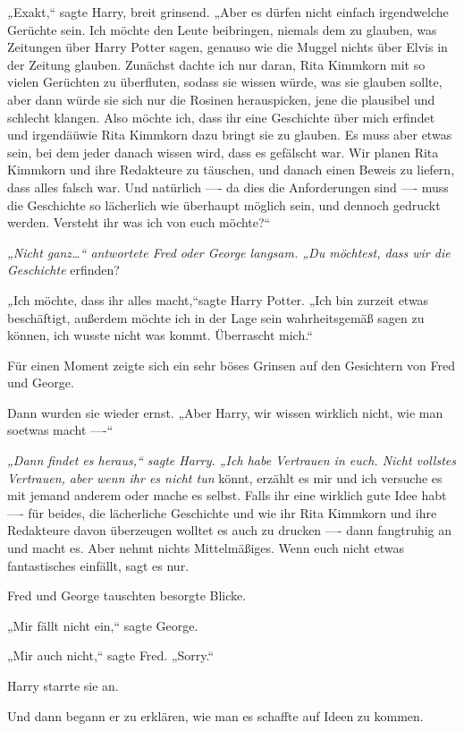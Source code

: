 {\emph{„}Exakt,“ sagte Harry, breit grinsend. „Aber es dürfen nicht einfach irgendwelche Gerüchte sein. Ich möchte den Leute beibringen, niemals dem zu glauben, was Zeitungen über Harry Potter sagen, genauso wie die Muggel nichts über Elvis in der Zeitung glauben. Zunächst dachte ich nur daran, Rita Kimmkorn mit so vielen Gerüchten zu überfluten, sodass sie wissen würde, was sie glauben sollte, aber dann würde sie sich nur die Rosinen herauspicken, jene die plausibel und schlecht klangen. Also möchte ich, dass ihr eine Geschichte über mich erfindet und irgendäüwie Rita Kimmkorn dazu bringt sie zu glauben. Es muss aber etwas sein, bei dem jeder danach wissen wird, dass es gefälscht war. Wir planen Rita Kimmkorn und ihre Redakteure zu täuschen, und danach einen Beweis zu liefern, dass alles falsch war. Und natürlich ---- da dies die Anforderungen sind ---- muss die Geschichte so lächerlich wie überhaupt möglich sein, und dennoch gedruckt werden. Versteht ihr was ich von euch möchte?“

\emph{„Nicht ganz…“ antwortete Fred oder George langsam. „Du möchtest, dass wir die Geschichte} erfinden?

\emph{„}Ich möchte, dass ihr alles macht,“sagte Harry Potter. „Ich bin zurzeit etwas beschäftigt, außerdem möchte ich in der Lage sein wahrheitsgemäß sagen zu können, ich wusste nicht was kommt. Überrascht mich.“

Für einen Moment zeigte sich ein sehr böses Grinsen auf den Gesichtern von Fred und George.

Dann wurden sie wieder ernst. „Aber Harry, wir wissen wirklich nicht, wie man soetwas macht ----“

\emph{„Dann findet es heraus,“ sagte Harry. „Ich habe Vertrauen in euch. Nicht vollstes Vertrauen, aber wenn ihr es nicht tun} könnt, erzählt es mir und ich versuche es mit jemand anderem oder mache es selbst. Falls ihr eine wirklich gute Idee habt ---- für beides, die lächerliche Geschichte und wie ihr Rita Kimmkorn und ihre Redakteure davon überzeugen wolltet es auch zu drucken ---- dann fangtruhig an und macht es. Aber nehmt nichts Mittelmäßiges. Wenn euch nicht etwas fantastisches einfällt, sagt es nur.

Fred und George tauschten besorgte Blicke.

„Mir fällt nicht ein,“ sagte George.

„Mir auch nicht,“ sagte Fred. „Sorry.“

Harry starrte sie an.

Und dann begann er zu erklären, wie man es schaffte auf Ideen zu kommen.

}
